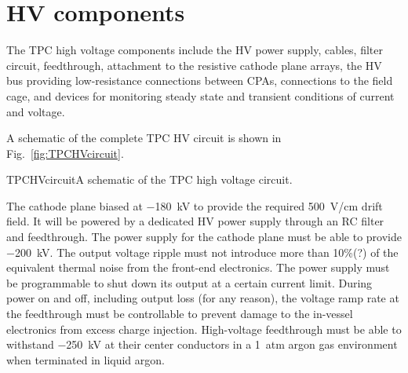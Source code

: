 




\section{HV components}

The TPC high voltage components include the HV power supply, cables,
filter circuit, feedthrough, attachment to the resistive cathode plane
arrays, the HV bus providing low-resistance connections between CPAs,
connections to the field cage, and devices for monitoring steady state
and transient conditions of current and voltage.

A schematic of the complete TPC HV circuit is shown in Fig.\ \ref{fig:TPCHVcircuit}.

\begin{cdrfigure}{TPCHVcircuit}{A schematic of the TPC high voltage circuit.}
\end{cdrfigure}


The cathode plane  biased at \SI{-180}{kV} to provide the
required \SI{500}{V/cm} drift field.  It will be
powered by a dedicated HV power supply through an RC filter and
feedthrough.  The power supply for the cathode plane must be able
to provide \SI{-200}{kV}.  The output voltage
ripple must not introduce more than 10\%(?) of the equivalent thermal
noise from the front-end electronics. The power supply must be
programmable to shut down its output at a certain current
limit. During power on and off, including output loss (for any
reason), the voltage ramp rate at the feedthrough must be controllable
to prevent damage to the in-vessel electronics from excess charge
injection. High-voltage feedthrough must be able to withstand \SI{-250}{kV}
at their center conductors in a \SI{1}{atm} argon gas environment when
terminated in liquid argon.

